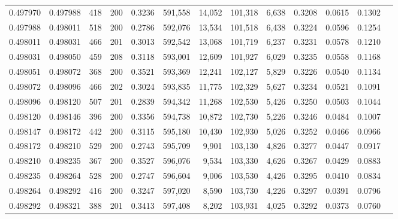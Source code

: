 \begin{tabular}{rrrrrrrrrrrrr}
0.497970 & 0.497988 &   418 & 200 &                                     0.3236 & 591,558 &  14,052 & 101,318 &   6,638 & 0.3208 & 0.0615 & 0.1302 \\
0.497988 & 0.498011 &   518 & 200 &                                     0.2786 & 592,076 &  13,534 & 101,518 &   6,438 & 0.3224 & 0.0596 & 0.1254 \\
0.498011 & 0.498031 &   466 & 201 &                                     0.3013 & 592,542 &  13,068 & 101,719 &   6,237 & 0.3231 & 0.0578 & 0.1210 \\
0.498031 & 0.498050 &   459 & 208 &                                     0.3118 & 593,001 &  12,609 & 101,927 &   6,029 & 0.3235 & 0.0558 & 0.1168 \\
0.498051 & 0.498072 &   368 & 200 &                                     0.3521 & 593,369 &  12,241 & 102,127 &   5,829 & 0.3226 & 0.0540 & 0.1134 \\
0.498072 & 0.498096 &   466 & 202 &                                     0.3024 & 593,835 &  11,775 & 102,329 &   5,627 & 0.3234 & 0.0521 & 0.1091 \\
0.498096 & 0.498120 &   507 & 201 &                                     0.2839 & 594,342 &  11,268 & 102,530 &   5,426 & 0.3250 & 0.0503 & 0.1044 \\
0.498120 & 0.498146 &   396 & 200 &                                     0.3356 & 594,738 &  10,872 & 102,730 &   5,226 & 0.3246 & 0.0484 & 0.1007 \\
0.498147 & 0.498172 &   442 & 200 &                                     0.3115 & 595,180 &  10,430 & 102,930 &   5,026 & 0.3252 & 0.0466 & 0.0966 \\
0.498172 & 0.498210 &   529 & 200 &                                     0.2743 & 595,709 &   9,901 & 103,130 &   4,826 & 0.3277 & 0.0447 & 0.0917 \\
0.498210 & 0.498235 &   367 & 200 &                                     0.3527 & 596,076 &   9,534 & 103,330 &   4,626 & 0.3267 & 0.0429 & 0.0883 \\
0.498235 & 0.498264 &   528 & 200 &                                     0.2747 & 596,604 &   9,006 & 103,530 &   4,426 & 0.3295 & 0.0410 & 0.0834 \\
0.498264 & 0.498292 &   416 & 200 &                                     0.3247 & 597,020 &   8,590 & 103,730 &   4,226 & 0.3297 & 0.0391 & 0.0796 \\
0.498292 & 0.498321 &   388 & 201 &                                     0.3413 & 597,408 &   8,202 & 103,931 &   4,025 & 0.3292 & 0.0373 & 0.0760 \\

\end{tabular}
